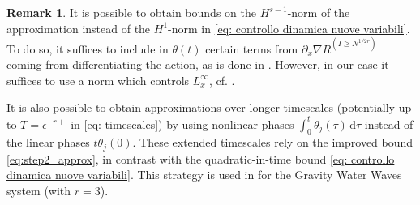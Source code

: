 \documentclass[a4paper,10pt,reqno]{article}
\theoremstyle{definition}
\theoremstyle{plain}
\theoremstyle{plain}
\theoremstyle{definition}
\theoremstyle{plain}
\theoremstyle{plain}
\theoremstyle{plain}
\theoremstyle{definition}
\newtheorem{rem}[definition]{Remark}
\theoremstyle{definition}
\def \pa{{\partial}}
\begin{document}
\begin{rem} \label{rem dyn 3}
   It is possible to obtain bounds on the $H^{s-1}$-norm of the approximation instead of the $H^1$-norm in \eqref{eq: controllo dinamica nuove variabili}. To do so, it suffices to include in $\theta (t)$ certain terms from $\pa_x \nabla R^{(I \ge N^{1/2r})}$ coming from differentiating the action, as is done in \cite[Section~7.1.3]{bernier}. However, in our case it suffices to use a norm which controls $L^{\infty}_x$, cf. .



   


It is also possible to obtain approximations over longer timescales (potentially up to \(T = \epsilon^{-r+}\) in \eqref{eq: timescales}) by using nonlinear phases \(\int_0^t \theta_j(\tau)\,\mathrm{d}\tau\) instead of the linear phases \(t\theta_j(0)\). These extended timescales rely on the improved bound \eqref{eq:step2_approx}, in contrast with the quadratic-in-time bound \eqref{eq: controllo dinamica nuove variabili}. This strategy is used in \cite{bertimasperograndestaffilani} for the Gravity Water Waves system (with \(r=3\)).


\end{rem}
\end{document}

